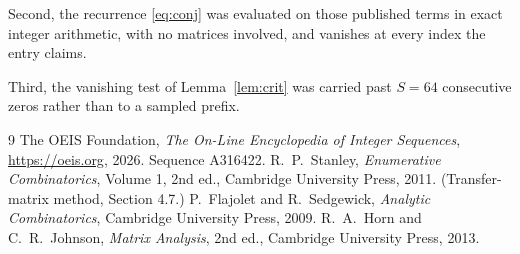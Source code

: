 \documentclass[11pt,a4paper]{article}
\theoremstyle{plain}
\theoremstyle{definition}
\begin{document}
Second, the recurrence \eqref{eq:conj} was evaluated on those published terms in exact
integer arithmetic, with no matrices involved, and vanishes at every index the entry claims.

Third, the vanishing test of Lemma~\ref{lem:crit} was carried past $S=64$ consecutive
zeros rather than to a sampled prefix.

\begin{thebibliography}{9}
 The OEIS Foundation, \emph{The On-Line Encyclopedia of Integer
Sequences}, \url{https://oeis.org}, 2026. Sequence A316422.
 R.~P.~Stanley, \emph{Enumerative Combinatorics}, Volume 1, 2nd ed.,
Cambridge University Press, 2011. (Transfer-matrix method, Section 4.7.)
 P.~Flajolet and R.~Sedgewick, \emph{Analytic Combinatorics}, Cambridge
University Press, 2009.
 R.~A.~Horn and C.~R.~Johnson, \emph{Matrix Analysis}, 2nd ed., Cambridge
University Press, 2013.
\end{thebibliography}
\end{document}
